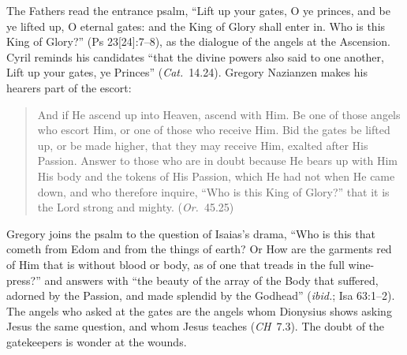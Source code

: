 The Fathers read the entrance psalm, ``Lift up your gates, O ye princes, and
be ye lifted up, O eternal gates: and the King of Glory shall enter in. Who
is this King of Glory?'' (Ps 23[24]:7--8), as the dialogue of the angels at
the Ascension. Cyril reminds his candidates ``that the divine powers also
said to one another, Lift up your gates, ye Princes'' (\emph{Cat.}\ 14.24).
Gregory Nazianzen makes his hearers part of the escort:

\begin{quote}
And if He ascend up into Heaven, ascend with Him. Be one of those angels who
escort Him, or one of those who receive Him. Bid the gates be lifted up, or
be made higher, that they may receive Him, exalted after His Passion. Answer
to those who are in doubt because He bears up with Him His body and the
tokens of His Passion, which He had not when He came down, and who therefore
inquire, ``Who is this King of Glory?'' that it is the Lord strong and
mighty. (\emph{Or.}\ 45.25)
\end{quote}

\noindent Gregory joins the psalm to the question of Isaias's drama, ``Who
is this that cometh from Edom and from the things of earth? Or How are the
garments red of Him that is without blood or body, as of one that treads in
the full wine-press?'' and answers with ``the beauty of the array of the
Body that suffered, adorned by the Passion, and made splendid by the
Godhead'' (\emph{ibid.}; Isa 63:1--2). The angels who asked at the gates are
the angels whom Dionysius shows asking Jesus the same question, and whom
Jesus teaches (\emph{CH}~7.3). The doubt of the gatekeepers is wonder at the
wounds.

